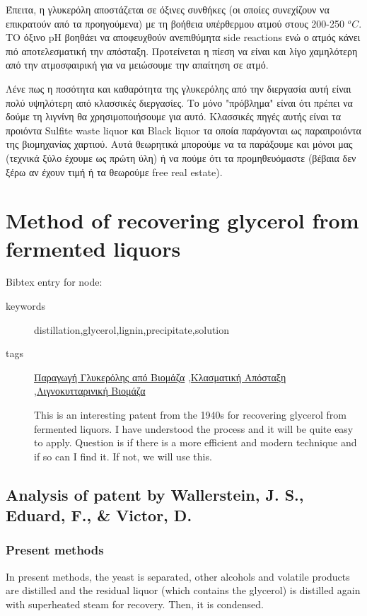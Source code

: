 \documentclass[11pt]{article}
\begin{document}
\begin{description}
Έπειτα, η γλυκερόλη αποστάζεται σε όξινες συνθήκες (οι οποίες συνεχίζουν να επικρατούν από τα προηγούμενα) με τη βοήθεια υπέρθερμου ατμού στους 200-250 \(^oC\). ΤΟ όξινο pH βοηθάει να αποφευχθούν ανεπιθύμητα side reactions ενώ ο ατμός κάνει πιό αποτελεσματική την απόσταξη. Προτείνεται η πίεση να είναι και λίγο χαμηλότερη από την ατμοσφαιρική για να μειώσουμε την απαίτηση σε ατμό.

Λένε πως η ποσότητα και καθαρότητα της γλυκερόλης από την διεργασία αυτή είναι πολύ υψηλότερη από κλασσικές διεργασίες. Το μόνο "πρόβλημα" είναι ότι πρέπει να δούμε τη λιγνίνη θα χρησιμοποιήσουμε για αυτό. Κλασσικές πηγές αυτής είναι τα προιόντα Sulfite waste liquor και Black liquor τα οποία παράγονται ως παραπροιόντα της βιομηχανίας χαρτιού. Αυτά θεωρητικά μπορούμε να τα παράξουμε και μόνοι μας (τεχνικά ξύλο έχουμε ως πρώτη ύλη) ή να πούμε ότι τα προμηθευόμαστε (βέβαια δεν ξέρω αν έχουν τιμή ή τα θεωρούμε free real estate).
\end{description}

\section{Method of recovering glycerol from fermented liquors}
\label{sec:org5d10d09}
Bibtex entry for node: \cite{wallersteinMethodRecoveringGlycerol1946}

\begin{description}
\item[{keywords}] distillation,glycerol,lignin,precipitate,solution
\item[{tags}] \href{\detokenize{../../../../org_roam/παραγωγη_γλυκερολης_απο_βιομαζα-13-10-22.org}}{Παραγωγή Γλυκερόλης από Βιομάζα} ,\href{\detokenize{../../../../org_roam/αποσταξη-06-11-21.org}}{Κλασματική Απόσταξη} ,\href{\detokenize{../../../../org_roam/λιγνοκυτταρινικη_βιομαζα-09-11-22.org}}{Λιγνοκυτταρινική Βιομάζα} 

This is an interesting patent from the 1940s for recovering glycerol from fermented liquors. I have understood the process and it will be quite easy to apply. Question is if there is a more efficient and modern technique and if so can I find it. If not, we will use this.
\end{description}
\subsection{Analysis of patent by Wallerstein, J. S., Eduard, F., \& Victor, D.}
\label{sec:orgead5c0c}
\subsubsection{Present methods}
\label{sec:orgf5fb903}
In present methods, the yeast is separated, other alcohols and volatile products are distilled and the residual liquor (which contains the glycerol) is distilled again with superheated steam for recovery. Then, it is condensed.
\end{document}
